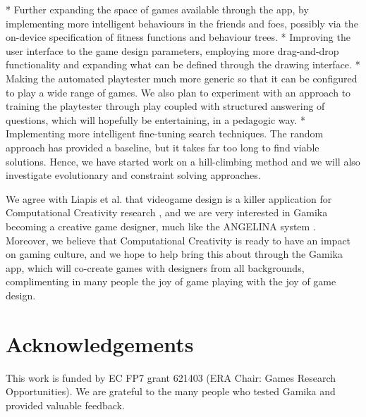\documentclass{IEEEtran}
\begin{document}
* Further expanding the space of games available through the app, by implementing more intelligent behaviours in the friends and foes, possibly via the on-device specification of fitness functions and behaviour trees.
* Improving the user interface to the game design parameters, employing more drag-and-drop functionality and expanding what can be defined through the drawing interface.
* Making the automated playtester much more generic so that it can be configured to play a wide range of games. We also plan to experiment with an approach to training the playtester through play coupled with structured answering of questions, which will hopefully be entertaining, in a pedagogic way.
* Implementing more intelligent fine-tuning search techniques. The random approach has provided a baseline, but it takes far too long to find viable solutions. Hence, we have started work on a hill-climbing method and we will also investigate evolutionary and constraint solving approaches.

We agree with Liapis et al. \cite{liapis2014gamecreativity} that videogame design is a killer application for Computational Creativity research \cite{colton:ecai12}, and we are very interested in Gamika becoming a creative game designer, much like the ANGELINA system \cite{cook:tcaig16}. Moreover, we believe that Computational Creativity is ready to have an impact on gaming culture, and we hope to help bring this about through the Gamika app, which will co-create games with designers from all backgrounds, complimenting in many people the joy of game playing with the joy of game design.

\section*{Acknowledgements}
This work is funded by EC FP7 grant 621403 (ERA Chair: Games Research Opportunities).
We are grateful to the many people who tested Gamika and provided valuable feedback.









\end{document}
